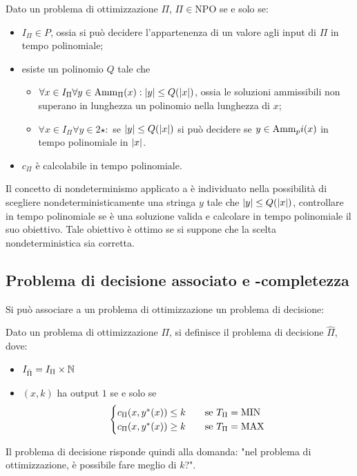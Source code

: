 \begin{defin}[\NPO]
	Dato un problema di ottimizzazione $\Pi$, $\Pi\in\text{NPO}$ se e solo se:
	\begin{itemize}
		\item $I_\Pi\in P$, ossia si può decidere l'appartenenza di un valore agli input di $\Pi$ in tempo polinomiale;
		\item esiste un polinomio $Q$ tale che
		      \begin{itemize}
			      \item $\forall x\in I_\Pi \forall y\in\mathrm{Amm}_\Pi(x): |y|\leq Q(|x|)$, ossia le soluzioni ammissibili non superano in lunghezza un polinomio nella lunghezza di $x$;
			      \item $\forall x\in I_\Pi \forall y\in 2\star:$ se $|y|\leq Q(|x|)$ si può decidere se $y\in\mathrm{Amm}_pi(x)$ in tempo polinomiale in $|x|$.
		      \end{itemize}
		\item $c_\Pi$ è calcolabile in tempo polinomiale.
	\end{itemize}
\end{defin}
Il concetto di nondeterminismo applicato a \NPO è individuato nella possibilità di scegliere nondeterministicamente una stringa $y$ tale che $|y|\leq Q(|x|)$, controllare in tempo polinomiale se è una soluzione valida e calcolare in tempo polinomiale il suo obiettivo. Tale obiettivo è ottimo se si suppone che la scelta nondeterministica sia corretta.


\subsection{Problema di decisione associato e \texorpdfstring{\NPO}{NPO}-completezza}
Si può associare a un problema di ottimizzazione un problema di decisione:
\begin{defin}
	Dato un problema di ottimizzazione $\Pi$, si definisce il problema di decisione $\hat\Pi$, dove:
	\begin{itemize}
		\item $I_{\hat\Pi}=I_\Pi\times\mathbb N$
		\item $(x,k)$ ha output $1$ se e solo se
		      \begin{equation*}
			      \begin{cases}
				      c_\Pi(x,y^*(x))\leq k \quad & \text{se } T_\Pi=\mathrm{MIN} \\
				      c_\Pi(x,y^*(x))\geq k \quad & \text{se } T_\Pi=\mathrm{MAX}
			      \end{cases}
		      \end{equation*}
	\end{itemize}
\end{defin}
Il problema di decisione risponde quindi alla domanda: "nel problema di ottimizzazione, è possibile fare meglio di $k$?".

